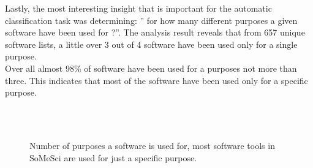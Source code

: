Lastly, the most interesting insight that is important for the automatic classification task was determining: ” for how many different purposes a given software have been used for ?”.  The analysis result reveals that from 657 unique software lists, a little over 3 out of 4 software have been used only for a single purpose. \\

Over all almost 98\% of software have been used for a purposes not more than three. This indicates that most of the software have been used only for a specific purpose.  


\begin{figure}[h]
	
	\myfloatalign
	
	 \\
	\\
	\caption{Number of purposes a software is used for, most software tools in SoMeSci are used for just a specific purpose.}
\end{figure}


